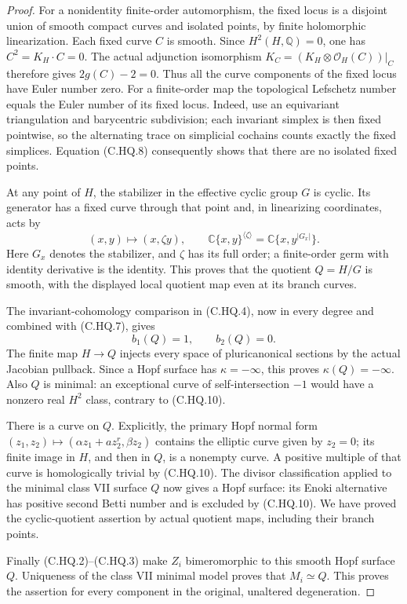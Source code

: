 \begin{proof}
For a nonidentity finite-order automorphism,
the fixed locus is a disjoint union of smooth
compact curves and isolated points, by finite
holomorphic linearization. Each fixed curve $C$
is smooth. Since $H^2(H,\mathbb Q)=0$, one has
$C^2=K_H\cdot C=0$. The actual adjunction
isomorphism $K_C=(K_H\otimes\mathcal O_H(C))|_C$
therefore gives $2g(C)-2=0$. Thus all the
curve components of the fixed locus have Euler
number zero. For a finite-order
map the topological Lefschetz number equals
the Euler number of its fixed locus. Indeed,
use an equivariant triangulation and barycentric
subdivision; each invariant simplex is then
fixed pointwise, so the alternating trace
on simplicial cochains counts exactly the
fixed simplices. Equation (C.HQ.8) consequently
shows that there are no isolated fixed points.

At any point of $H$, the stabilizer in the
effective cyclic group $G$ is cyclic. Its
generator has a fixed curve through that
point and, in linearizing coordinates, acts
by
\[
                (x,y)\longmapsto(x,\zeta y),
 \qquad
 \mathbb C\{x,y\}^{\langle\zeta\rangle}
                    =\mathbb C\{x,y^{|G_x|}\}.
 \tag{C.HQ.9}
\]
Here $G_x$ denotes the stabilizer, and
$\zeta$ has its full order; a finite-order
germ with identity derivative is the identity.
This proves that the quotient $Q=H/G$ is
smooth, with the displayed local quotient
map even at its branch curves.

The invariant-cohomology comparison in
(C.HQ.4), now in every degree and combined
with (C.HQ.7), gives
\[
                         b_1(Q)=1,
                         \qquad b_2(Q)=0.
 \tag{C.HQ.10}
\]
The finite map $H\to Q$ injects every space
of pluricanonical sections by the actual
Jacobian pullback. Since a Hopf surface
has $\kappa=-\infty$, this proves
$\kappa(Q)=-\infty$. Also $Q$ is minimal:
an exceptional curve of self-intersection
$-1$ would have a nonzero real $H^2$ class,
contrary to (C.HQ.10).

There is a curve on $Q$. Explicitly, the
primary Hopf normal form
$(z_1,z_2)\mapsto(\alpha z_1+a z_2^r,\beta z_2)$
contains the elliptic curve given by $z_2=0$;
its finite image in $H$, and then in $Q$,
is a nonempty curve. A positive multiple
of that curve is homologically trivial by
(C.HQ.10). The divisor classification
\cite[Remark~2.7]{DlousskyTeleman2012} applied
to the minimal class VII surface $Q$ now
gives a Hopf surface: its Enoki alternative
has positive second Betti number and is
excluded by (C.HQ.10). We have proved the
cyclic-quotient assertion by actual quotient
maps, including their branch points.

Finally (C.HQ.2)--(C.HQ.3) make $Z_i$
bimeromorphic to this smooth Hopf surface
$Q$. Uniqueness of the class VII minimal
model proves that $M_i\simeq Q$. This
proves the assertion for every component
in the original, unaltered degeneration.
\end{proof}
